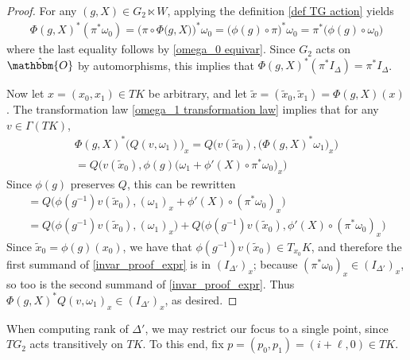 \documentclass[11pt,letterpaper]{amsart}
\numberwithin{equation}{section}
\newcommand{\oct}{\hat{\mathbbm{O}}}
\begin{document}
\begin{proof}
    For any $(g,X)\in G_2\ltimes W$, applying the definition \eqref{def TG action} yields
    \begin{gather}
        \Phi(g,X)^*(\pi^*\omega_0) = \big(\pi\circ \Phi(g,X\big)\big)^*\omega_0 = \big(\phi(g)\circ\pi\big)^*\omega_0 = \pi^*\big(\phi(g)\circ \omega_0\big)
    \end{gather}
    where the last equality follows by \eqref{omega_0 equivar}. Since $G_2$ acts on $\oct$ by automorphisms, this implies that $\Phi(g,X)^*(\pi^*I_\Delta) = \pi^*I_\Delta$.

    Now let $x = (x_0,x_1)\in TK$ be arbitrary, and let $\tilde x = (\tilde x_0,\tilde x_1) = \Phi(g,X)(x)$. The transformation law \eqref{omega_1 transformation law} implies that for any $v\in \Gamma(TK)$,
    \begin{gather}
        \Phi(g,X)^*\big(Q(v,\omega_1)\big)_x = Q\Big(v(\tilde x_0),\big(\Phi(g,X)^*\omega_1\big)_x\Big) 
        \\
        = Q\Big(v(\tilde x_0),\phi(g)\big(\omega_1+\phi'(X)\circ \pi^*\omega_0\big)_{x}\Big)
    \end{gather}
    Since $\phi(g)$ preserves $Q$, this can be rewritten
    \begin{gather}
        = Q\big(\phi(g^{-1})v(\tilde x_0),(\omega_1)_x+\phi'(X)\circ (\pi^*\omega_0)_{x}\big)
        \\
        \label{invar_proof_expr}
        =Q\big(\phi(g^{-1})v(\tilde x_0),(\omega_1)_x\big)
        +
        Q\big(\phi(g^{-1})v(\tilde x_0),\phi'(X)\circ (\pi^*\omega_0)_{x}\big)
    \end{gather}
    Since $\tilde x_0 = \phi(g)(x_0)$, we have that $\phi(g^{-1})v(\tilde x_0)\in T_{x_0}K$, and therefore the first summand of \eqref{invar_proof_expr} is in $(I_{\Delta'})_x$; because $(\pi^*\omega_0)_{x}\in (I_{\Delta'})_x$, so too is the second summand of \eqref{invar_proof_expr}.
    Thus $\Phi(g,X)^*Q(v,\omega_1)_x\in (I_{\Delta'})_x$, as desired.
\end{proof}

When computing rank of $\Delta'$, we may restrict our focus to a single point, since $TG_2$ acts transitively on $TK$. To this end, fix $p=(p_0,p_1)= (i + \ell,0)\in TK$.
\end{document}
